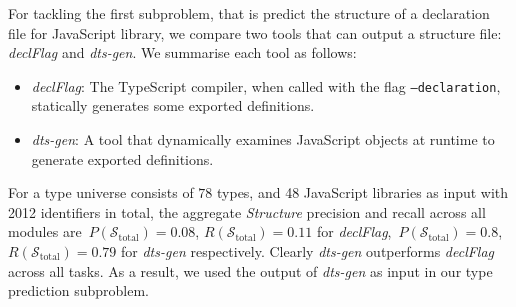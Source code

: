 \documentclass[sigplan,10pt,review,anonymous]{acmart} %
\theoremstyle{plain}
\theoremstyle{remark}
\theoremstyle{definition}
\begin{document}
For tackling the first subproblem, that is predict the structure of a declaration file for JavaScript library, we compare two tools that can output a structure file: \textit{declFlag} and \textit{dts-gen}.
We summarise each tool as follows:
\begin{itemize}[label={\tiny$\bullet$}]
	\item \textit{declFlag}: The TypeScript compiler, when called with the flag
	      \texttt{--declaration}, statically generates some exported definitions.
	\item \textit{dts-gen}: A tool that dynamically examines JavaScript objects at
	      runtime to generate exported definitions.
\end{itemize}
For a type universe consists of $78$ types, and 48 JavaScript libraries as input with 2012 identifiers in total, the aggregate \textit{Structure} precision and recall across all modules are~$P(\mathcal{S}_\text{total}) = 0.08$,
$R(\mathcal{S}_\text{total}) = 0.11$ for \textit{declFlag},~$P(\mathcal{S}_\text{total}) = 0.8$,
$R(\mathcal{S}_\text{total}) = 0.79$ for \textit{dts-gen} respectively.
Clearly \textit{dts-gen} outperforms \textit{declFlag} across all tasks.
As a result, we used the output of \textit{dts-gen} as input in our type prediction subproblem. 
\end{document}
